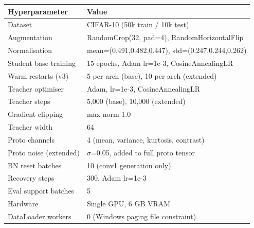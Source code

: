 \documentclass{article}
\begin{document}
\begin{longtable}[]{@{}ll@{}}
\toprule\noalign{}
Hyperparameter & Value \\
\midrule\noalign{}
\endhead
\bottomrule\noalign{}
\endlastfoot
Dataset & CIFAR-10 (50k train / 10k test) \\
Augmentation & RandomCrop(32, pad=4), RandomHorizontalFlip \\
Normalisation & mean=(0.491,0.482,0.447), std=(0.247,0.244,0.262) \\
Student base training & 15 epochs, Adam lr=1e-3, CosineAnnealingLR \\
Warm restarts (v3) & 5 per arch (base), 10 per arch (extended) \\
Teacher optimiser & Adam, lr=1e-3, CosineAnnealingLR \\
Teacher steps & 5,000 (base), 10,000 (extended) \\
Gradient clipping & max norm 1.0 \\
Teacher width & 64 \\
Proto channels & 4 (mean, variance, kurtosis, contrast) \\
Proto noise (extended) & $\sigma$=0.05, added to full proto tensor \\
BN reset batches & 10 (conv1 generation only) \\
Recovery steps & 300, Adam lr=1e-3 \\
Eval support batches & 5 \\
Hardware & Single GPU, 6 GB VRAM \\
DataLoader workers & 0 (Windows paging file constraint) \\
\end{longtable}
\end{document}
